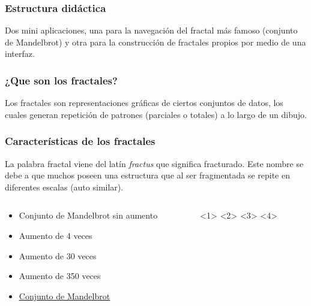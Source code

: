 \documentclass{beamer}
\begin{document}
\begin{frame} [label=FRACTAL]
  \frametitle{Estructura didáctica}
  Dos mini aplicaciones, una para la navegación del fractal más famoso (conjunto de Mandelbrot) y otra para la construcción de fractales propios por medio de una interfaz.
\end{frame}

\begin{frame} 
 \frametitle{¿Que son los fractales?}
  Los fractales son representaciones gráficas de ciertos conjuntos de datos, los cuales generan repetición de patrones (parciales o totales) a lo largo de un dibujo.
  \begin{center}
  \end{center}
\end{frame}


\begin{frame}
  \frametitle{Características de los fractales}   
  La palabra fractal viene del latín \textit{fractus} que significa fracturado. Este nombre se debe a que muchos poseen una estructura que al ser fragmentada se repite en diferentes escalas (auto similar).
  \begin{columns}
    \begin{column}[l]{5cm}
      \begin{itemize}
      \item <1> Conjunto de Mandelbrot sin aumento
      \item <2> Aumento de 4 veces
      \item <3> Aumento de 30 veces
      \item <4> Aumento de 350 veces
      \item <5> \underline{\href{http://127.0.0.1/index.php?q=node/66}{Conjunto de Mandelbrot}}
      \end{itemize}
    \end{column}
    \begin{column}[r]{5cm}
      <1>
      <2>
      <3>
      <4>
    \end{column}
  \end{columns}   
\end{frame}
\end{document}
